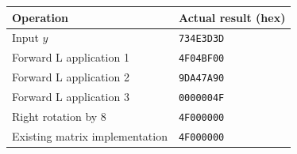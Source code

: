 \begin{center}\begin{tabular}{ll}\toprule
Operation & Actual result (hex)\\\midrule
Input $y$ & \texttt{734E3D3D}\\
Forward L application 1 & \texttt{4F04BF00}\\
Forward L application 2 & \texttt{9DA47A90}\\
Forward L application 3 & \texttt{0000004F}\\
Right rotation by 8 & \texttt{4F000000}\\
Existing matrix implementation & \texttt{4F000000}\\
\bottomrule\end{tabular}\end{center}
